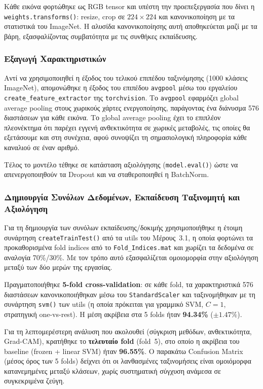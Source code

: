 \documentclass[12pt, a4paper]{article}
\begin{document}
Κάθε εικόνα φορτώθηκε ως RGB tensor και υπέστη την προεπεξεργασία
που δίνει η \texttt{weights.transforms()}: resize, crop σε $224 \times 224$
και κανονικοποίηση με τα στατιστικά του ImageNet. Η αλυσίδα κανονικοποίησης αυτή αποθηκεύεται
μαζί με τα βάρη, εξασφαλίζοντας συμβατότητα με τις συνθήκες εκπαίδευσης.

\subsubsection{Εξαγωγή Χαρακτηριστικών}

Αντί να χρησιμοποιηθεί η έξοδος του τελικού επιπέδου ταξινόμησης (1000 κλάσεις
ImageNet), απομονώθηκε η έξοδος του επιπέδου \texttt{avgpool} μέσω του εργαλείου
\texttt{create\_feature\_extractor} της \texttt{torchvision}. Το \texttt{avgpool}
εφαρμόζει global average pooling στους χωρικούς χάρτες ενεργοποίησης, παράγοντας
ένα διάνυσμα 576 διαστάσεων για κάθε εικόνα. Το global average pooling έχει το επιπλέον πλεονέκτημα ότι παρέχει
εγγενή ανθεκτικότητα σε χωρικές μεταβολές, τις οποίες θα εξετάσουμε και στη συνέχεια, αφού συνοψίζει τη σημασιολογική
πληροφορία κάθε καναλιού σε έναν αριθμό.

Τέλος το μοντέλο τέθηκε σε κατάσταση αξιολόγησης (\texttt{model.eval()}) ώστε να
απενεργοποιηθούν τα Dropout και να σταθεροποιηθεί η BatchNorm.

\subsubsection{Δημιουργία Συνόλων Δεδομένων, Εκπαίδευση Ταξινομητή και Αξιολόγηση}

Για τη δημιουργία των συνόλων εκπαίδευσης/δοκιμής χρησιμοποιήθηκε η έτοιμη
συνάρτηση \texttt{createTrainTest()} από τα utils του Μέρους~3.1, η οποία
φορτώνει τα προκαθορισμένα fold indices από το \texttt{Fold\_Indices.mat} και
χωρίζει τα δεδομένα σε αναλογία 70\%/30\%. Με τον τρόπο αυτό εξασφαλίζεται
ομοιομορφία στην αξιολόγηση μεταξύ των δύο μερών της εργασίας.

Πραγματοποιήθηκε \textbf{5-fold cross-validation}: σε κάθε fold, τα
χαρακτηριστικά 576 διαστάσεων κανονικοποιήθηκαν μέσω του \texttt{StandardScaler}
και ταξινομήθηκαν με τη συνάρτηση \texttt{svm()} των utils (η οποία πρόκειται για γραμμικό SVM,
$C=1$, στρατηγική one-vs-rest). Η μέση ακρίβεια στα 5 folds ήταν
\textbf{94.34\%} ($\pm 1.47\%$).

Για τη λεπτομερέστερη ανάλυση που ακολουθεί (σύγκριση μεθόδων, ανθεκτικότητα,
Grad-CAM), κρατήθηκε το \textbf{τελευταίο fold} (fold~5), στο οποίο η
ακρίβεια του baseline (frozen + linear SVM) ήταν \textbf{96.55\%}.
Ο παρακάτω Confusion Matrix (μέσος όρος των 5 folds) δείχνει ότι οι
λανθασμένες ταξινομήσεις είναι ομοιόμορφα κατανεμημένες μεταξύ κλάσεων, χωρίς
συστηματική σύγχυση ανάμεσα σε συγκεκριμένα ζεύγη.
\end{document}
